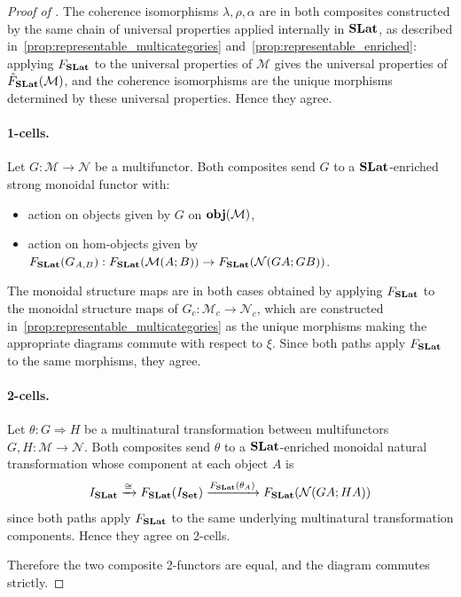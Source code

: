 \begin{proof}[Proof of ]
    The coherence isomorphisms $\lambda, \rho, \alpha$ are in both composites constructed by the same chain of universal properties applied internally in $\mathbf{SLat}$, as described in~\autoref{prop:representable_multicategories} and~\autoref{prop:representable_enriched}: applying $F_{\mathbf{SLat}}$ to the universal properties of $\mathcal{M}$ gives the universal properties of $\hat{F}_{\mathbf{SLat}}(\mathcal{M})$, and the coherence isomorphisms are the unique morphisms determined by these universal properties. Hence they agree.

    \paragraph{1-cells.} Let $G : \mathcal{M} \to \mathcal{N}$ be a multifunctor. Both composites send $G$ to a $\mathbf{SLat}$-enriched strong monoidal functor with:
    \begin{itemize}
        \item action on objects given by $G$ on ${\mathbf{obj}(\mathcal{M})}$,
        \item action on hom-objects given by $F_{\mathbf{SLat}}(G_{A,B}) : F_{\mathbf{SLat}}(\mathcal{M}(A;B)) \to F_{\mathbf{SLat}}(\mathcal{N}(GA;GB))$.
    \end{itemize}
    The monoidal structure maps are in both cases obtained by applying $F_{\mathbf{SLat}}$ to the monoidal structure maps of $G_c : \mathcal{M}_c \to \mathcal{N}_c$, which are constructed in~\autoref{prop:representable_multicategories} as the unique morphisms making the appropriate diagrams commute with respect to $\xi$. Since both paths apply $F_{\mathbf{SLat}}$ to the same morphisms, they agree.

    \paragraph{2-cells.} Let $\theta : G \Rightarrow H$ be a multinatural transformation between multifunctors $G, H : \mathcal{M} \to \mathcal{N}$. Both composites send $\theta$ to a $\mathbf{SLat}$-enriched monoidal natural transformation whose component at each object $A$ is
    \[
    I_{\mathbf{SLat}} \xrightarrow{\cong} F_{\mathbf{SLat}}(I_{\mathbf{Set}}) \xrightarrow{F_{\mathbf{SLat}}(\theta_A)} F_{\mathbf{SLat}}(\mathcal{N}(GA;HA))
    \]
    since both paths apply $F_{\mathbf{SLat}}$ to the same underlying multinatural transformation components. Hence they agree on 2-cells.

    Therefore the two composite 2-functors are equal, and the diagram commutes strictly.
\end{proof}

